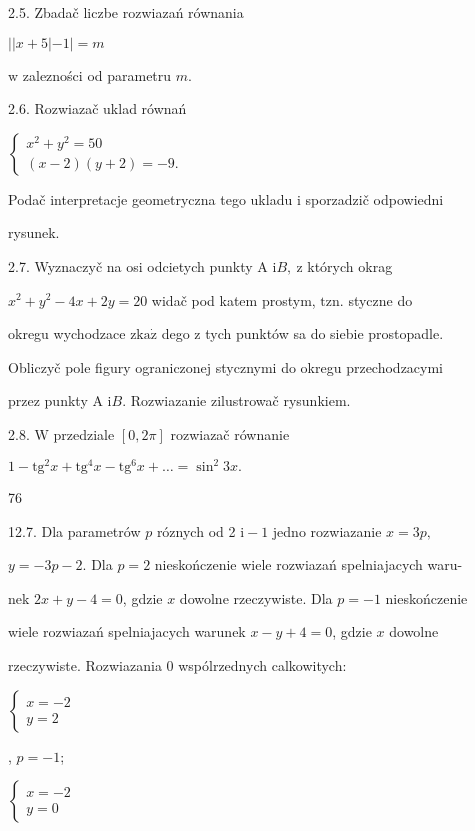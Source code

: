 \documentclass[a4paper,12pt]{article}
\begin{document}
2.5. Zbadač liczbe rozwiazań równania

$||x+5|-1|=m$

$\mathrm{w}$ zalezności od parametru $m.$

2.6. Rozwiazač uklad równań

$\left\{\begin{array}{l}
x^{2}+y^{2}=50\\
(x-2)(y+2)=-9.
\end{array}\right.$

Podač interpretacje geometryczna tego ukladu $\mathrm{i}$ sporzadzič odpowiedni

rysunek.

2.7. Wyznaczyč na osi odcietych punkty A $\mathrm{i} B,\ \mathrm{z}$ których okrag

$x^{2}+y^{2}-4x+2y= 20$ widač pod katem prostym, $\mathrm{t}\mathrm{z}\mathrm{n}$. styczne do

okregu wychodzace $\mathrm{z}\mathrm{k}\mathrm{a}\dot{\mathrm{z}}$ dego $\mathrm{z}$ tych punktów sa do siebie prostopadle.

Obliczyč pole figury ograniczonej stycznymi do okregu przechodzacymi

przez punkty A $\mathrm{i}B$. Rozwiazanie zilustrowač rysunkiem.

2.8. $\mathrm{W}$ przedziale $[0,2\pi]$ rozwiazač równanie

$1-\mathrm{t}\mathrm{g}^{2}x+\mathrm{t}\mathrm{g}^{4}x-\mathrm{t}\mathrm{g}^{6}x+\ldots=\sin^{2}3x.$





76

12.7. Dla parametrów $p$ róznych od 2 $\mathrm{i}-1$ jedno rozwiazanie $x=3p,$

$y=-3p-2$. Dla $p=2$ nieskończenie wiele rozwiazań spelniajacych waru-

nek $2x+y-4=0$, gdzie $x$ dowolne rzeczywiste. Dla $p=-1$ nieskończenie

wiele rozwiazań spelniajacych warunek $x-y+4 = 0$, gdzie $x$ dowolne

rzeczywiste. Rozwiazania $0$ wspólrzednych calkowitych:

$\left\{\begin{array}{l}
x=-2\\
y=2
\end{array}\right.$

, $p=-1$;

$\left\{\begin{array}{l}
x=-2\\
y=0
\end{array}\right.$
\end{document}
